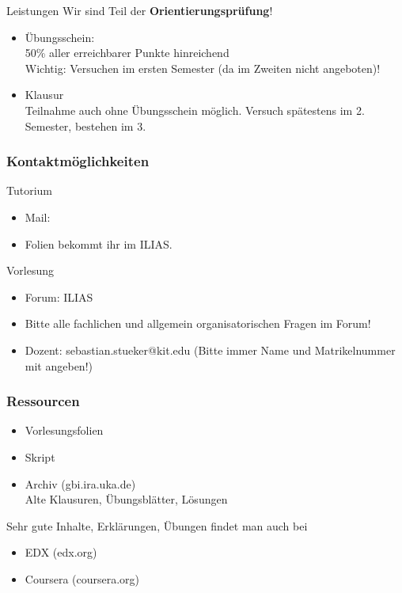\begin{frame} {Leistungen}
	Wir sind Teil der \textbf{Orientierungsprüfung}!
	\begin{itemize}
		\item Übungsschein:\\ 
			50\% aller erreichbarer Punkte hinreichend\\
			Wichtig: Versuchen im ersten Semester (da im Zweiten nicht angeboten)!
		\item Klausur \\
			Teilnahme auch ohne Übungsschein möglich.
			Versuch spätestens im 2. Semester, bestehen im 3.
	\end{itemize}

	\pause
\end{frame}

\begin{frame}
	\frametitle{Kontaktmöglichkeiten}
	
	\begin{block}{Tutorium}
		\begin{itemize}
			\item Mail: \mymail
			\item Folien bekommt ihr im ILIAS.
		\end{itemize} 
	\end{block}
	\pause
	
	\begin{block}{Vorlesung}
		\begin{itemize}
			\item Forum: ILIAS
			\item Bitte alle fachlichen und allgemein organisatorischen Fragen im Forum!
			\item Dozent: sebastian.stueker@kit.edu (Bitte immer Name und Matrikelnummer mit angeben!)
		\end{itemize}
	\end{block}
\end{frame}

\begin{frame}
	\frametitle{Ressourcen}
	
	\begin{itemize}
		\item Vorlesungsfolien
		\item Skript
		\item Archiv (gbi.ira.uka.de)\\
			  Alte Klausuren, Übungsblätter, Lösungen
	\end{itemize}

	\bigskip
	Sehr gute Inhalte, Erklärungen, Übungen findet man auch bei
	\begin{itemize}
		\item EDX (edx.org)
		\item Coursera (coursera.org)
	\end{itemize}
	
\end{frame}

